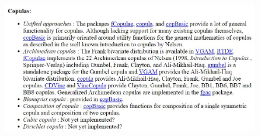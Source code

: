 \documentclass[MAIN.tex]{subfiles}
\begin{document}
\begin{frame}
	\begin{figure}
\centering
\includegraphics[width=0.7\linewidth]{images/CRANcopulas}
\caption{}
\label{fig:CRANcopulas}
\end{figure}

\end{frame}
\end{document}
